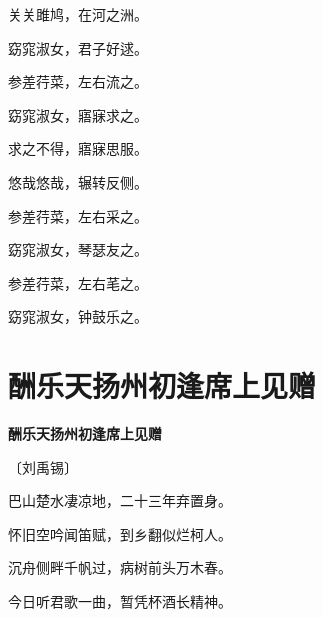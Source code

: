 \documentclass[12pt,UTF-8,openany,fontset=none]{ctexbook}
\begin{document}
\begin{center}
    \begin{Large}

        关关雎鸠，在河之洲。

        窈窕淑女，君子好逑。

        参差荇菜，左右流之。

        窈窕淑女，寤寐求之。

        求之不得，寤寐思服。

        悠哉悠哉，辗转反侧。

        参差荇菜，左右采之。

        窈窕淑女，琴瑟友之。

        参差荇菜，左右芼之。

        窈窕淑女，钟鼓乐之。

    \end{Large}

\end{center}

\vspace{8pt}
\clearpage

\section{酬乐天扬州初逢席上见赠}


\begin{center}
    {\bfseries 酬乐天扬州初逢席上见赠}

    \vspace{18pt}

    \begin{large}\xuwen
        〔刘禹锡〕
    \end{large}

\end{center}

    \vspace{18pt}  %

\begin{center}
    \begin{Large}

        巴山楚水凄凉地，二十三年弃置身。

        怀旧空吟闻笛赋，到乡翻似烂柯人。

        沉舟侧畔千帆过，病树前头万木春。

        今日听君歌一曲，暂凭杯酒长精神。

    \end{Large}

\end{center}
\end{document}
